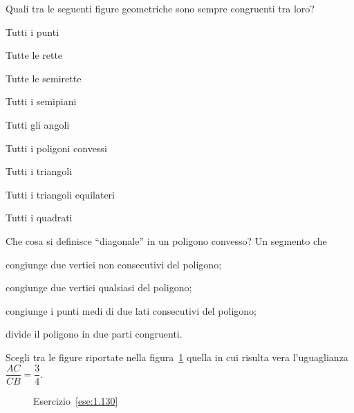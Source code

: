 \begin{esercizio}
\label{ese:1.128}
Quali tra le seguenti figure geometriche sono sempre congruenti tra 
loro?
\begin{multicols}{2}
\begin{enumeratea}
\item Tutti i punti				
\tab\tab\boxV\quad\boxF
\item Tutte le rette				
\tab\tab\boxV\quad\boxF
\item Tutte le semirette				
\tab\boxV\quad\boxF
\item Tutti i semipiani				\tab\boxV\quad\boxF
\item Tutti gli angoli			\tab\tab\boxV\quad\boxF
\item Tutti i poligoni convessi		\tab\boxV\quad\boxF
\item Tutti i triangoli			\tab\tab\boxV\quad\boxF
\item Tutti i triangoli equilateri	\tab\boxV\quad\boxF
\item Tutti i quadrati			\tab\tab\boxV\quad\boxF
\end{enumeratea}
\end{multicols}
\end{esercizio}


\begin{esercizio}
\label{ese:1.129}
Che cosa si definisce ``diagonale'' in un poligono convesso? Un 
segmento che
\begin{enumeratea}
\item congiunge due vertici non consecutivi del poligono;
\item congiunge due vertici qualsiasi del poligono;
\item congiunge i punti medi di due lati consecutivi del poligono;
\item divide il poligono in due parti congruenti.
\end{enumeratea}
\end{esercizio}

	
\begin{esercizio}
\label{ese:1.130}
Scegli tra le figure riportate nella figura~\ref{fig:ese1.130} quella 
in cui risulta vera l'uguaglianza $\dfrac{AC}{CB}=\dfrac{3}{4}$.
\end{esercizio}


\begin{inaccessibleblock}
 \begin{figure}[htb]
 \centering
 \caption{Esercizio~\ref{ese:1.130}}\label{fig:ese1.130}
\end{figure}
\end{inaccessibleblock}

